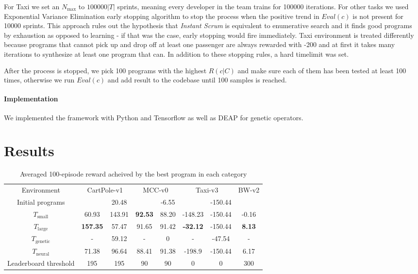 For Taxi we set an $N_\text{max}$ to $100000 |T|$ sprints, meaning every developer in the team trains for 100000 iterations.
For other tasks we used Exponential Variance Elimination \cite{evestop} early stopping algorithm to stop the process when the positive trend in $Eval(c)$ is not present for 10000 sprints.
This approach rules out the hypothesis that \emph{Instant Scrum} is equivalent to enumerative search and it finds good programs by exhaustion as opposed to learning - if that was the case, early stopping would fire immediately.
Taxi environment is treated differently because programs that cannot pick up and drop off at least one passenger are always rewarded with -200 and at first it takes many iterations to synthesize at least one program that can.
In addition to these stopping rules, a hard timelimit was set.

After the process is stopped, we pick 100 programs with the highest $R(c|C)$ and make sure each of them has been tested at least 100 times, otherwise we run $Eval(c)$ and add result to the codebase until 100 samples is reached. 

\paragraph{Implementation}

We implemented the framework with Python and Tensorflow as well as DEAP \cite{deap} for genetic operators.

\newpage
\section{Results}
\label{sec:results}

\begin{table*}[]
    \centering
    \begin{tabular}{c|c|c|c|c|c|c|c}
         Environment & \multicolumn{2}{c}{CartPole-v1} & \multicolumn{2}{c}{MCC-v0} & \multicolumn{2}{c}{Taxi-v3} & BW-v2 \\
         Initial programs & & 20.48 & & -6.55 & & -150.44 & \\
         \midrule
         $T_\text{small}$  &    60.93 &    143.91 &     \textbf{92.53} &     88.20 &   -148.23 &   -150.44 &     -0.16\\
         $T_\text{large}$ & \textbf{157.35} &     57.47 &     91.65 &     91.42 &    \textbf{-32.12} &   -150.44 &      \textbf{8.13} \\ 
         $T_\text{genetic}$& - & 59.12 & - & 0 & - & -47.54 & - \\ 
         $T_\text{neural}$ & 71.38 & 96.64 & 88.41 & 91.38 & -198.9 & -150.44 & 6.17 \\
         \midrule
         Leaderboard threshold & 195 & 195 & 90 & 90 & 0 & 0 & 300 \\ 
    \end{tabular}
    \caption{Averaged 100-episode reward acheived by the best program in each category}
    \label{tab:results}
\end{table*}

